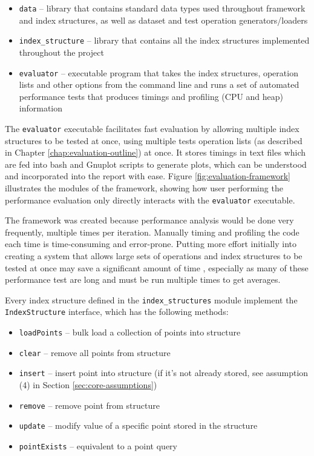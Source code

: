 \begin{itemize}
	\item \texttt{data} -- library that contains standard data types used throughout framework and index structures, as well as dataset and test operation generators/loaders
	\item \texttt{index\_structure} -- library that contains all the index structures implemented throughout the project
	\item \texttt{evaluator} -- executable program that takes the index structures, operation lists and other options from the command line and runs a set of automated performance tests that produces timings and profiling (CPU and heap) information
\end{itemize}

The \texttt{evaluator} executable facilitates fast evaluation by allowing multiple index structures to be tested at once, using multiple tests operation lists (as described in Chapter \ref{chap:evaluation-outline}) at once. It stores timings in text files which are fed into bash and Gnuplot scripts to generate plots, which can be understood and incorporated into the report with ease. Figure \ref{fig:evaluation-framework} illustrates the modules of the framework, showing how user performing the performance evaluation only directly interacts with the \texttt{evaluator} executable.

The framework was created because performance analysis would be done very frequently, multiple times per iteration. Manually timing and profiling the code each time is time-consuming and error-prone. Putting more effort initially into creating a system that allows large sets of operations and index structures to be tested at once may save a significant amount of time , especially as many of these performance test are long and must be run multiple times to get averages.

Every index structure defined in the \texttt{index\_structures} module implement the \texttt{IndexStructure} interface, which has the following methods:
\begin{itemize}
	\item \texttt{loadPoints} -- bulk load a collection of points into structure
	\item \texttt{clear} -- remove all points from structure
	\item \texttt{insert} -- insert point into structure (if it's not already stored, see assumption (4) in Section \ref{sec:core-assumptions})
	\item \texttt{remove} -- remove point from structure
	\item \texttt{update} -- modify value of a specific point stored in the structure
	\item \texttt{pointExists} -- equivalent to a point query
\end{itemize}

